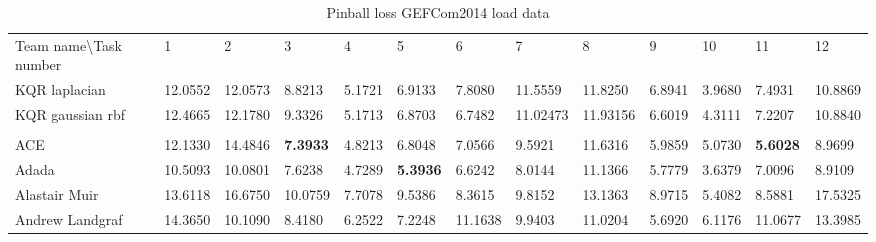 \begin{table}[!ht]
    \caption{Pinball loss GEFCom2014 load data}
    \label{tab:pinball loss gefcom2014 load data}
    \begin{adjustbox}{width=\textwidth}
    \begin{tabular}{lllllllllllll}
      \toprule
      \midrule
      Team name\textbackslash Task number                       & 1                               & 2                                  & 3                               & 4                              & 5                              & 6       & 7                               & 8       & 9       & 10                             & 11                             & 12                              \\
  
  KQR laplacian
  & 
  12.0552
  &
  12.0573
  &
  8.8213
  &
  5.1721
  &
  6.9133
  &
  7.8080
  &
  11.5559
  &
  11.8250
  &
  6.8941
  &
  3.9680
  &
  7.4931
  &
  10.8869
  \\
  KQR gaussian rbf
  & 
  12.4665
  &
  12.1780
  &
  9.3326
  &
  5.1713
  &
  6.8703
  &
  6.7482
  &
  11.02473
  &
  11.93156
  &
  6.6019
  &
  4.3111
  &
  7.2207
  &
  10.8840
  \\
  \\
  ACE                        & 12.1330                         & 14.4846                         & \textbf{7.3933}                          & 4.8213                         & 6.8048                         & 7.0566  & 9.5921                          & 11.6316 & 5.9859  & 5.0730 & \textbf{5.6028}                         & 8.9699                          \\
  Adada                      & 10.5093                         & 10.0801                         & 7.6238                          & 4.7289                         & \textbf{5.3936}                         & 6.6242  & 8.0144                          & 11.1366 & 5.7779  & 3.6379                         & 7.0096                         & 8.9109                          \\
  Alastair Muir              & 13.6118                         & 16.6750                         & 10.0759                         & 7.7078 & 9.5386 & 8.3615  & 9.8152                          & 13.1363 & 8.9715  & 5.4082                         & 8.5881 & 17.5325                         \\
  Andrew Landgraf            & 14.3650                         & 10.1090                         & 8.4180                          & 6.2522                         & 7.2248                         & 11.1638 & 9.9403                          & 11.0204 & 5.6920  & 6.1176                         & 11.0677                        & 13.3985                         \\

\end{tabular}
\end{adjustbox}
\end{table}
